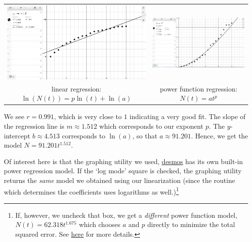 \documentclass{ximera}
\begin{document}
\begin{center}

\begin{tabular}{cc}

\includegraphics[width=3in]{./ApplicationsofExponentialandLogarithmicFunctionsGraphics/ExpLogAppEx10.jpg} &

\includegraphics[width=3in]{./ApplicationsofExponentialandLogarithmicFunctionsGraphics/ExpLogAppEx06a.jpg} \\

linear regression: $\ln(N(t)) = p \ln(t) + \ln(a)$ &

power function regression: $N(t) = at^{p}$ \\

\end{tabular}

\end{center}



We see $r=0.991$, which is very close to $1$ indicating a very good fit.   The slope of the regression line is $m \approx 1.512$ which corresponds to our exponent $p$.  The $y$-intercept $b \approx 4.513$ corresponds to $\ln(a)$, so that $a \approx 91.201$.  Hence, we get the model $N = 91.201 t^{1.512}$. 

\smallskip

Of interest here is that the graphing utility we used, \href{https://www.desmos.com}{\underline{desmos}} has its own built-in power regression model.  If the `log mode'  square is checked, the graphing utility returns the \textit{same} model we obtained using our linearization (since the routine which determines the coefficients uses logarithms as well.)\footnote{If, however, we uncheck that box, we get a \textit{different} power function model, $N(t) = 62.318 t^{1.675}$ which chooses $a$ and $p$ directly to minimize the total squared error.  See \href{http://support.desmos.com/hc/en-us/articles/204349605}{\underline{here}} for more details.}
\end{document}
